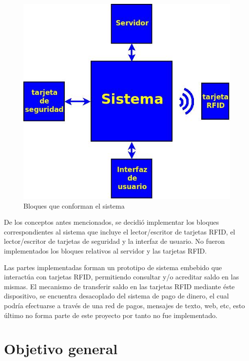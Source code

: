 \begin{figure}[H]
\centering
  \begin{center}
  \includegraphics[scale=.4]{Imagenes/diagrama_def.jpg} 
  \end{center}
  \caption{Bloques que conforman el sistema}\label{HW_gral} 
\end{figure}

De los conceptos antes mencionados, se decidió implementar los bloques correspondientes al 
sistema que incluye el lector/escritor de tarjetas RFID, el lector/escritor de tarjetas 
de seguridad y la interfaz de usuario.
No fueron implementados los bloques relativos al servidor y las tarjetas RFID.

\bigskip
Las partes implementadas forman un prototipo de sistema embebido que interactúa con tarjetas RFID,
permitiendo consultar y/o acreditar saldo en las mismas.
El mecanismo de transferir saldo en las tarjetas RFID mediante éste dispositivo, se encuentra
desacoplado del sistema de pago de dinero, el cual podría efectuarse a través de una red de pagos,
mensajes de texto, web, etc, esto último no forma parte de este proyecto por tanto no fue implementado.


\section{Objetivo general}

